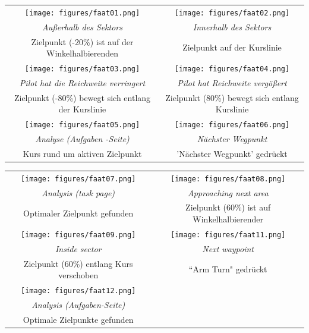 \begin{maxipage}
\begin{center}
\begin{longtable}{|c|c|}
\toprule
\texttt{[image: figures/faat01.png]} &
\texttt{[image: figures/faat02.png]} \\
{\em Außerhalb des Sektors } & {\em Innerhalb des Sektors} \\
Zielpunkt (-20\%) ist auf der Winkelhalbierenden & Zielpunkt auf der Kurslinie \\

\midrule
\texttt{[image: figures/faat03.png]} &
\texttt{[image: figures/faat04.png]} \\
{\em Pilot hat die Reichweite verringert} & {\em Pilot hat Reichweite  vergößert} \\
Zielpunkt (-80\%) bewegt sich entlang der Kurslinie  & Zielpunkt (80\%) bewegt sich entlang Kurslinie \\

\midrule
\texttt{[image: figures/faat05.png]} &
\texttt{[image: figures/faat06.png]} \\
{\em Analyse (Aufgaben -Seite)} & {\em Nächster Wegpunkt} \\
Kurs rund um aktiven Zielpunkt & 'Nächster Wegpunkt' gedrückt\\
\bottomrule
\end{longtable}
\end{center}
\end{maxipage}

\begin{maxipage}
\begin{center}
\begin{longtable}{|c|c|}
\toprule
\texttt{[image: figures/faat07.png]} &
\texttt{[image: figures/faat08.png]} \\
{\em Analysis (task page)} & {\em Approaching next area} \\
Optimaler Zielpunkt gefunden & Zielpunkt (60\%) ist auf Winkelhalbierender\\

\midrule
\texttt{[image: figures/faat09.png]} &
\texttt{[image: figures/faat11.png]} \\
{\em Inside sector} & {\em Next waypoint} \\
Zielpunkt (60\%) entlang Kurs verschoben & ``Arm Turn" gedrückt\\

\midrule
\texttt{[image: figures/faat12.png]} &  \\
{\em Analysis (Aufgaben-Seite)} &  \\
Optimale Zielpunkte gefunden  &  \\

\bottomrule
\end{longtable}
\end{center}
\end{maxipage}

